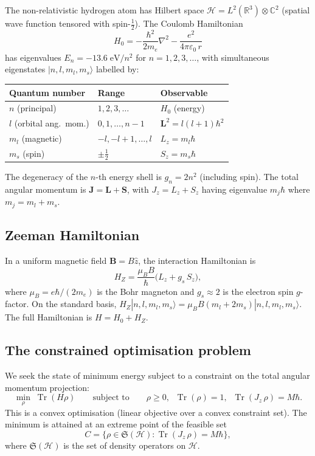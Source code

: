 \documentclass[11pt,a4paper]{article}
\theoremstyle{definition}
\newcommand{\R}{\mathbb{R}}
\newcommand{\Tr}{\operatorname{Tr}}
\newcommand{\ket}[1]{|#1\rangle}
\begin{document}
The non-relativistic hydrogen atom has Hilbert space
$\mathcal{H} = L^2(\R^3) \otimes \mathbb{C}^2$ (spatial wave function
tensored with spin-$\tfrac{1}{2}$).  The Coulomb Hamiltonian
\[
  H_0 = -\frac{\hbar^2}{2m_e}\nabla^2 - \frac{e^2}{4\pi\varepsilon_0\, r}
\]
has eigenvalues $E_n = -13.6\;\mathrm{eV}/n^2$ for $n = 1, 2, 3, \ldots$,
with simultaneous eigenstates $\ket{n, l, m_l, m_s}$ labelled by:
\begin{center}
\begin{tabular}{lll}
\toprule
\textbf{Quantum number} & \textbf{Range} & \textbf{Observable} \\
\midrule
$n$ (principal) & $1, 2, 3, \ldots$ & $H_0$ (energy) \\
$l$ (orbital ang.\ mom.) & $0, 1, \ldots, n - 1$ & $\mathbf{L}^2 = l(l+1)\hbar^2$ \\
$m_l$ (magnetic) & $-l, -l+1, \ldots, l$ & $L_z = m_l \hbar$ \\
$m_s$ (spin) & $\pm\tfrac{1}{2}$ & $S_z = m_s \hbar$ \\
\bottomrule
\end{tabular}
\end{center}
The degeneracy of the $n$-th energy shell is $g_n = 2n^2$ (including
spin).  The total angular momentum is $\mathbf{J} = \mathbf{L} + \mathbf{S}$,
with $J_z = L_z + S_z$ having eigenvalue $m_j \hbar$ where $m_j = m_l + m_s$.

\subsection{Zeeman Hamiltonian}

In a uniform magnetic field $\mathbf{B} = B\hat{z}$, the interaction
Hamiltonian is
\[
  H_Z = \frac{\mu_B B}{\hbar}\bigl(L_z + g_s\, S_z\bigr),
\]
where $\mu_B = e\hbar/(2m_e)$ is the Bohr magneton and $g_s \approx 2$
is the electron spin $g$-factor.  On the standard basis,
$H_Z \ket{n,l,m_l,m_s} = \mu_B B (m_l + 2m_s)\ket{n,l,m_l,m_s}$.
The full Hamiltonian is $H = H_0 + H_Z$.

\subsection{The constrained optimisation problem}

We seek the state of minimum energy subject to a constraint on the
total angular momentum projection:
\begin{equation}\label{eq:hydrogen-opt}
  \min_{\rho}\; \Tr(H\rho)
  \qquad\text{subject to}\qquad
  \rho \geq 0, \;\; \Tr(\rho) = 1, \;\;
  \Tr(J_z\, \rho) = M\hbar.
\end{equation}
This is a convex optimisation (linear objective over a convex
constraint set).  The minimum is attained at an extreme point of the
feasible set
\[
  C = \bigl\{\rho \in \mathfrak{S}(\mathcal{H}) :
  \Tr(J_z\,\rho) = M\hbar\bigr\},
\]
where $\mathfrak{S}(\mathcal{H})$ is the set of density operators on
$\mathcal{H}$.
\end{document}
